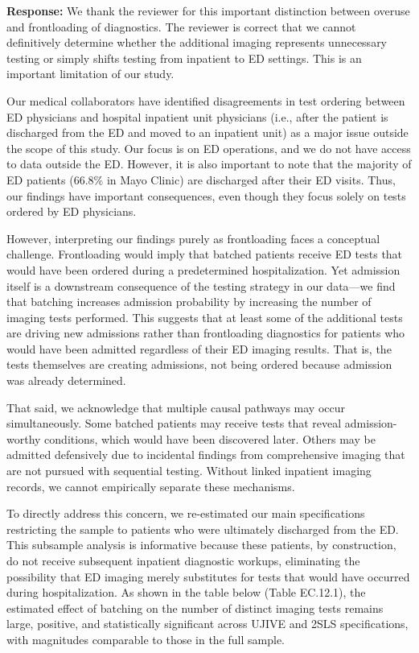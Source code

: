 \documentclass[11pt]{article}
\newcommand{\1}{\hbox{\rm 1\kern-.35em 1}}
\begin{document}
\noindent\textbf{Response:} \color{blue}We thank the reviewer for this important distinction between overuse and frontloading of diagnostics. The reviewer is correct that we cannot definitively determine whether the additional imaging represents unnecessary testing or simply shifts testing from inpatient to ED settings. This is an important limitation of our study.

Our medical collaborators have identified disagreements in test ordering between ED physicians and hospital inpatient unit physicians (i.e., after the patient is discharged from the ED and moved to an inpatient unit) as a major issue outside the scope of this study. Our focus is on ED operations, and we do not have access to data outside the ED. However, it is also important to note that the majority of ED patients (66.8\% in Mayo Clinic) are discharged after their ED visits. Thus, our findings have important consequences, even though they focus solely on tests ordered by ED physicians. 

However, interpreting our findings purely as frontloading faces a conceptual challenge. Frontloading would imply that batched patients receive ED tests that would have been ordered during a predetermined hospitalization. Yet admission itself is a downstream consequence of the testing strategy in our data---we find that batching increases admission probability by increasing the number of imaging tests performed. This suggests that at least some of the additional tests are driving new admissions rather than frontloading diagnostics for patients who would have been admitted regardless of their ED imaging results. That is, the tests themselves are creating admissions, not being ordered because admission was already determined.

That said, we acknowledge that multiple causal pathways may occur simultaneously. Some batched patients may receive tests that reveal admission-worthy conditions, which would have been discovered later. Others may be admitted defensively due to incidental findings from comprehensive imaging that are not pursued with sequential testing. Without linked inpatient imaging records, we cannot empirically separate these mechanisms.

To directly address this concern, we re-estimated our main specifications restricting the sample to patients who were ultimately discharged from the ED. This subsample analysis is informative because these patients, by construction, do not receive subsequent inpatient diagnostic workups, eliminating the possibility that ED imaging merely substitutes for tests that would have occurred during hospitalization. As shown in the table below (Table EC.12.1), the estimated effect of batching on the number of distinct imaging tests remains large, positive, and statistically significant across UJIVE and 2SLS specifications, with magnitudes comparable to those in the full sample.
\end{document}
